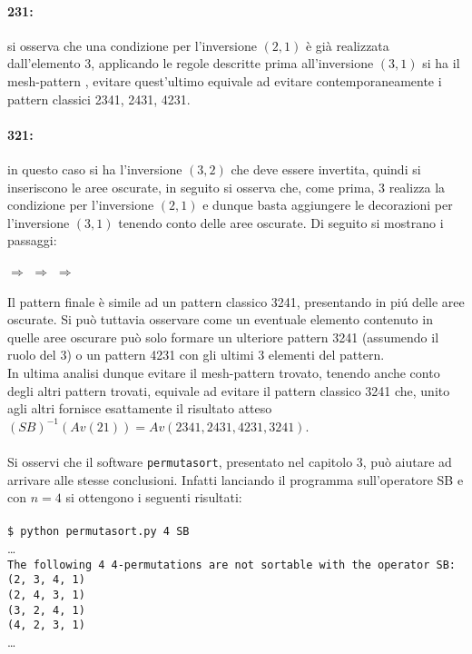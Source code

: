 \paragraph*{231:} si osserva che una condizione per l'inversione $(2,1)$ \`e gi\`a realizzata dall'elemento $3$, applicando le regole descritte prima all'inversione $(3,1)$ si ha il mesh-pattern , evitare quest'ultimo equivale ad evitare contemporaneamente i pattern classici 2341, 2431, 4231.
\paragraph*{321:} in questo caso si ha l'inversione $(3,2)$ che deve essere invertita, quindi si inseriscono le aree oscurate, in seguito si osserva che, come prima, $3$ realizza la condizione per l'inversione $(2,1)$ e dunque basta aggiungere le decorazioni per l'inversione $(3,1)$ tenendo conto delle aree oscurate. Di seguito si mostrano i passaggi:
\begin{center}
$\Rightarrow$
$\Rightarrow$
$\Rightarrow$
\end{center}
Il pattern finale \`e simile ad un pattern classico 3241, presentando in pi\'u delle aree oscurate. Si pu\`o tuttavia osservare come un eventuale elemento contenuto in quelle aree oscurare pu\`o solo formare un ulteriore pattern 3241 (assumendo il ruolo del 3) o un pattern 4231 con gli ultimi 3 elementi del pattern.\\
In ultima analisi dunque evitare il mesh-pattern trovato, tenendo anche conto degli altri pattern trovati, equivale ad evitare il pattern classico 3241 che, unito agli altri fornisce esattamente il risultato atteso $(SB)^{-1}(Av(21))=Av(2341, 2431, 4231, 3241)$.\\\\
Si osservi che il software \texttt{permutasort}, presentato nel capitolo 3, pu\`o aiutare ad arrivare alle stesse conclusioni. Infatti lanciando il programma sull'operatore SB e con $n=4$ si ottengono i seguenti risultati:\\\\\texttt{\$ python permutasort.py 4 SB }\\\dots\\\texttt{The following 4 4-permutations are not sortable with the operator SB:}\\\texttt{(2, 3, 4, 1)}\\\texttt{(2, 4, 3, 1)}\\\texttt{(3, 2, 4, 1)}\\\texttt{(4, 2, 3, 1)}\\\dots\\\\
